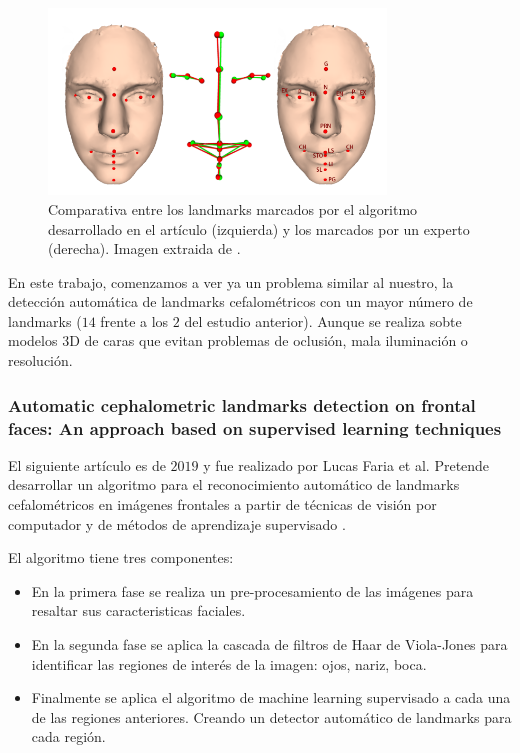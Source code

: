                 \begin{figure}[!h]
                    \centering
                    \includegraphics[width=0.8\textwidth]{img/comparativa_landmarks.png}
                    \caption{Comparativa entre los landmarks marcados por el algoritmo desarrollado en el artículo (izquierda) y los marcados por un experto (derecha). Imagen extraida de \cite{galvanek2015automated}.}
                    \label{fig:landmarks_comparativa}
                \end{figure}

                \medskip

                \noindent En este trabajo, comenzamos a ver ya un problema similar al nuestro, la detección automática de landmarks cefalométricos con un mayor número de landmarks ($14$ frente a los $2$ del estudio anterior). Aunque se realiza sobte modelos $3$D de caras que evitan problemas de oclusión, mala iluminación o resolución.

            \subsubsection*{Automatic cephalometric landmarks detection on frontal faces: An approach based on supervised learning techniques}

                \noindent El siguiente artículo es de $2019$ y fue realizado por Lucas Faria et al. Pretende desarrollar un algoritmo para el reconocimiento automático de landmarks cefalométricos en imágenes frontales a partir de técnicas de visión por computador y de métodos de aprendizaje supervisado \cite{porto2019automatic}.

                \medskip

                \noindent El algoritmo tiene tres componentes:

                \begin{itemize}
                    \item En la primera fase se realiza un pre-procesamiento de las imágenes para resaltar sus caracteristicas faciales. 
                    \item En la segunda fase se aplica la cascada de filtros de Haar de Viola-Jones para identificar las regiones de interés de la imagen: ojos, nariz, boca.
                    \item Finalmente se aplica el algoritmo de machine learning supervisado a cada una de las regiones anteriores. Creando un detector automático de landmarks para cada región.
                \end{itemize}

